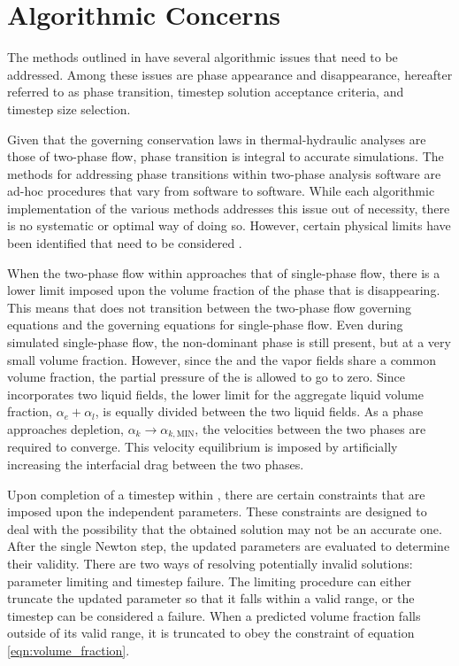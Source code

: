 \section{Algorithmic Concerns}
\label{sect:algorithmic_concerns}

The methods outlined in  have several algorithmic issues that need to be addressed.
Among these issues are phase appearance and disappearance, hereafter referred to as phase transition, timestep solution acceptance criteria, and timestep size selection.

Given that the governing conservation laws in thermal-hydraulic analyses are those of two-phase flow, phase transition is integral to accurate simulations.
The methods for addressing phase transitions within two-phase analysis software are ad-hoc procedures that vary from software to software.
While each algorithmic implementation of the various methods addresses this issue out of necessity, there is no systematic or optimal way of doing so.
However, certain physical limits have been identified that need to be considered \cite{Bestion2000}.

When the two-phase flow within \cobra{} approaches that of single-phase flow, there is a lower limit imposed upon the volume fraction of the phase that is disappearing.
This means that \cobra{} does not transition between the two-phase flow governing equations and the governing equations for single-phase flow.
Even during simulated single-phase flow, the non-dominant phase is still present, but at a very small volume fraction.
However, since the \ncgs{} and the vapor fields share a common volume fraction, the partial pressure of the \ncgs{} is allowed to go to zero. 
Since \cobra{} incorporates two liquid fields, the lower limit for the aggregate liquid volume fraction, $\alpha_e + \alpha_l$, is equally divided between the two liquid fields.
As a phase approaches depletion, $\alpha_k \rightarrow \alpha_{k,\text{MIN}}$, the velocities between the two phases are required to converge.
This velocity equilibrium is imposed by artificially increasing the interfacial drag between the two phases.

Upon completion of a timestep within \cobra{}, there are certain constraints that are imposed upon the independent parameters.
These constraints are designed to deal with the possibility that the obtained solution may not be an accurate one.
After the single Newton step, the updated parameters are evaluated to determine their validity.
There are two ways of resolving potentially invalid solutions: parameter limiting and timestep failure.
The limiting procedure can either truncate the updated parameter so that it falls within a valid range, or the timestep can be considered a failure.
When a predicted volume fraction falls outside of its valid range, it is truncated to obey the constraint of equation \eqref{eqn:volume_fraction}.

